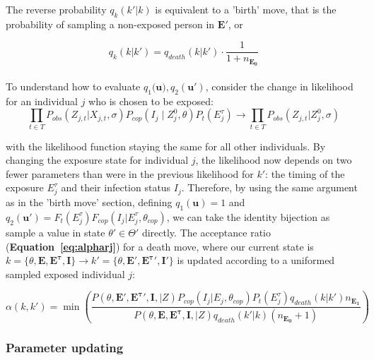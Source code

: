 \documentclass{article}
\begin{document}
The reverse probability $q_k(k' | k)$ is equivalent to a 'birth' move, that is the probability of sampling a non-exposed person in $\mathbf{E}'$, or 

\begin{equation}
q_k(k | k') = q_{death}(k | k')\cdot \frac{1}{1 + n_{\mathbf{E_0}}}
\end{equation}


\paragraph{}To understand how to evaluate $q_1(\mathbf{u)}, q_2(\mathbf{u}')$, consider the change in likelihood for an individual $j$ who is chosen to be exposed:
\begin{equation}
 \prod_{t \in T}P_{obs}(Z_{j,t}|X_{j,t}, \sigma)P_{cop}(I_j \mid  Z^0_{j}, \theta)P_t(E_j^\tau) \rightarrow \prod_{t \in T}P_{obs}(Z_{j,t}|Z^0_{j}, \sigma) 
\end{equation}

with the likelihood function staying the same for all other individuals. By changing the exposure state for individual $j$, the likelihood now depends on two fewer parameters than were in the previous likelihood for $k'$: the timing of the exposure $E^\tau_j$ and their infection status $I_j$. Therefore, by using the same argument as in the 'birth move' section, defining $q_1(\mathbf{u}) = 1$ and $q_2(\mathbf{u}') = F_t(E^\tau_j)F_{cop}(I_j | E_j^\tau, \theta_{cop})$, we can take the identity bijection as sample a value in state $\theta' \in \Theta'$ directly.  The acceptance ratio (\textbf{Equation~\ref{eq:alpharj}}) for a death move, where our current state is $k = \{\theta, \mathbf{E}, \mathbf{E^\tau}, \mathbf{I}\} \rightarrow k' = \{\theta, \mathbf{E}', \mathbf{E^\tau}', \mathbf{I}'\}$ is updated according to a uniformed sampled exposed individual $j$:

\begin{equation}
\label{acc:death}
\alpha(k, k') = \min\left(\frac{P(\theta, \mathbf{E}', \mathbf{E^{\tau}}', \mathbf{I}, | Z)P_{cop}(I_{j} | E_{j}, \theta_{cop})P_t(E^\tau_j)q_{death}(k|k')n_{\mathbf{E_1}}}{P(\theta, \mathbf{E}, \mathbf{E^{\tau}}, \mathbf{I}, | Z)q_{death}(k'|k)(n_{\mathbf{E_0}} + 1)} \right)
\end{equation}

\subsubsection{Parameter updating}
\end{document}
